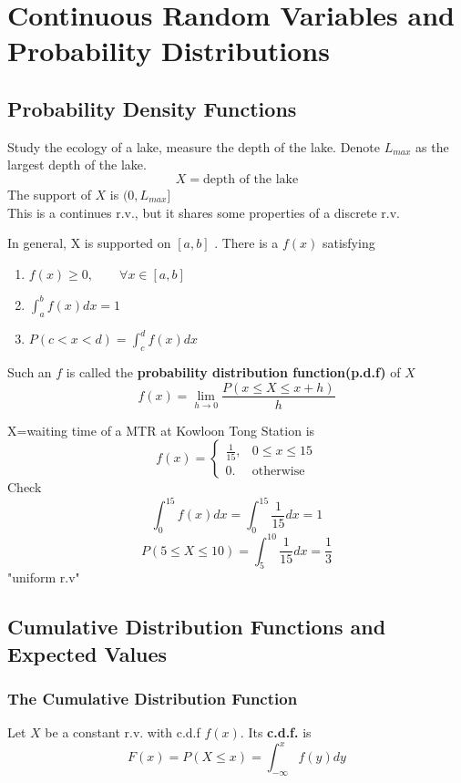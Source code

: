 \chapter{Continuous Random Variables and Probability Distributions}
\section{Probability Density Functions}
\begin{exmp}
Study the ecology of a lake, measure the depth of the lake. Denote $L_{max}$ as the largest depth of the lake.
\[X = \text{depth of the lake}\]
The support of $X$ is $(0, L_{max}]$ \\
This is a continues r.v., but it shares some properties of a discrete r.v.
\end{exmp}

\begin{defn}
In general, X is supported on $[a,b]$ . There is a $f(x)$ satisfying
\begin{enumerate}
\item $f(x) \geq 0, \qquad \forall x \in [a,b]$
\item $\int _a^b f(x) dx=1$
\item $P(c<x<d)=\int _c^d f(x)dx$
\end{enumerate}
Such an $f$ is called the \textbf{probability distribution function(p.d.f)} of $X$
\[f(x)=\lim_{h \to 0} \frac{P(x \leq X \leq x+h)}{h} \]
\end{defn}

\begin{exmp}
X=waiting time of a MTR at Kowloon Tong Station is 
\[f(x)=\begin{cases}
\frac{1}{15}, 	&0 \leq x \leq 15\\
0. &\text{otherwise}
\end{cases}\]
Check
\[\int_0^{15} f(x)dx=\int_0^{15} \frac{1}{15}dx=1\]
\[P(5\leq X \leq 10)=\int_5^{10} \frac{1}{15}dx=\frac{1}{3}\]
"uniform r.v"
\end{exmp}


\section{Cumulative Distribution Functions and Expected Values}
\subsection{The Cumulative Distribution Function}
\begin{defn}
Let $X$ be a constant r.v. with c.d.f $f(x)$. Its \textbf{c.d.f.} is 
\[F(x)=P(X \leq x)=\int_{-\infty}^{x}f(y)dy\]
\end{defn}

